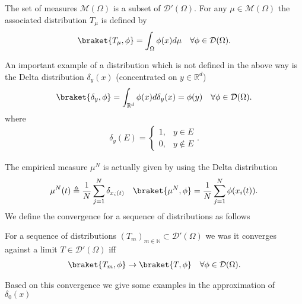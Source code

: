 \begin{example}
 The set of  measures  $\mathcal{M}(\Omega )$ is a subset of $\mathcal{D}'(\Omega )$. 
 For any $\mu \in \mathcal{M}(\Omega )$ the associated distribution $T_{\mu }$ is defined by 
 \begin{align*}
   \braket{T_\mu ,\phi } = \int_\Omega \phi(x) d\mu  \quad \forall \phi  \in \mathcal{D}(\Omega )
 .\end{align*}
\end{example}
\begin{example}
 An important example of a distribution which is not defined in the above way
 is the Delta distribution $\delta_y(x)$  (concentrated on $y \in  \mathbb{R}^{d} $) 
 \begin{align*}
   \braket{\delta_y,\phi } = \int_{\mathbb{R}^{d} } \phi(x) d \delta_y(x) = \phi(y) \quad \forall \phi  \in \mathcal{D}(\Omega )
 .\end{align*}
 where 
 \begin{align*}
  \delta_y(E) = \begin{cases}
    1, &y \in  E \\
    0,&y \notin E
  \end{cases}
 .\end{align*}
\end{example}
The empirical measure $\mu ^{N} $ is actually given by using the Delta distribution 
\begin{align*}
  \mu ^{N}(t) \triangleq \frac{1}{N} \sum_{j=1}^{N} \delta_{x_i(t)}   \quad \braket{\mu ^{N},\phi  } = \frac{1}{N} \sum_{j=1}^{N} \phi(x_i(t)) 
.\end{align*}
We define the convergence for a sequence of distributions as follows 
\begin{definition}
  For a sequence of distributions $(T_m)_{m \in  \mathbb{N}} \subset  \mathcal{D}'(\Omega )$  we was it converges against
  a limit $T \in \mathcal{D}'(\Omega )$ iff 
  \begin{align*}
    \braket {T_m,\phi } \to \braket{T,\phi } \quad \forall \phi  \in \mathcal{D}(\Omega )
  .\end{align*}
\end{definition}
Based on this convergence we give some examples in the approximation of $\delta_0(x)$
